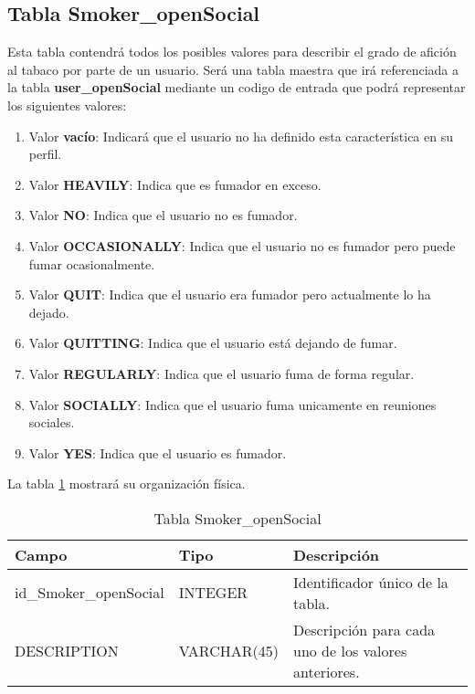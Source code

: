 \subsection{Tabla Smoker\_openSocial}
Esta tabla contendrá todos los posibles valores para describir el grado de afición al tabaco por parte de un usuario. Será una tabla maestra que irá referenciada a la tabla \textbf{user\_openSocial} mediante un codigo de entrada que podrá representar los siguientes valores:
\begin{enumerate}
\item Valor \textbf{vacío}: Indicará que el usuario no ha definido esta característica en su perfil.
\item Valor \textbf{HEAVILY}: Indica que es fumador en exceso.
\item Valor \textbf{NO}: Indica que el usuario no es fumador.
\item Valor \textbf{OCCASIONALLY}: Indica que el usuario no es fumador pero puede fumar ocasionalmente.
\item Valor \textbf{QUIT}: Indica que el usuario era fumador pero actualmente lo ha dejado.
\item Valor \textbf{QUITTING}: Indica que el usuario está dejando de fumar.
\item Valor \textbf{REGULARLY}: Indica que el usuario fuma de forma regular.
\item Valor \textbf{SOCIALLY}: Indica que el usuario fuma unicamente en reuniones sociales.
\item Valor \textbf{YES}: Indica que el usuario es fumador.
\end{enumerate}
\bigskip
\par
La tabla \ref{tabSmokerOpenSocial} mostrará su organización física.
\bigskip
\par
\begin{table}[h]
\begin{center}
\begin{tabular}{| l | l | p{60mm} |}\hline
\textbf{Campo}&\textbf{Tipo}&\textbf{Descripción} \\ \hline
id\_Smoker\_openSocial & INTEGER & Identificador único de la tabla. \\ \hline
DESCRIPTION & VARCHAR(45) & Descripción para cada uno de los valores anteriores. \\ \hline
\end{tabular}
\end{center}
\caption{Tabla Smoker\_openSocial} \label{tabSmokerOpenSocial}
\end{table}

